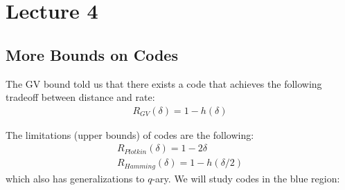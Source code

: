 \section{Lecture 4}

\subsection{More Bounds on Codes}

The GV bound told us that there exists a code that achieves the following
tradeoff between distance and rate:
\begin{align*}
    R_{GV}(\delta) = 1 - h(\delta) 
\end{align*}

The limitations (upper bounds) of codes are the following:
\begin{align*}
    R_{Plotkin}(\delta) = 1 - 2\delta \\
    R_{Hamming}(\delta) = 1 - h(\delta/2)
\end{align*}
which also has generalizations to $q$-ary. We will study codes in the blue region:


